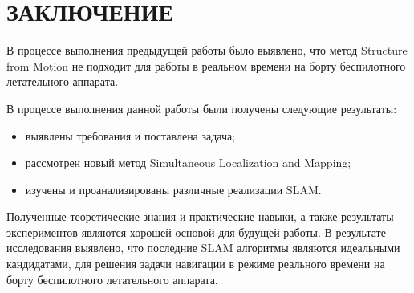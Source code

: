 \chapter*{ЗАКЛЮЧЕНИЕ}

В процессе выполнения предыдущей работы было выявлено, что метод Structure from Motion не подходит для работы в реальном времени на борту беспилотного летательного аппарата.

В процессе выполнения данной работы были получены следующие результаты:

\begin{itemize}
    \item выявлены требования и поставлена задача;
    \item рассмотрен новый метод Simultaneous Localization and Mapping;
    \item изучены и проанализированы различные реализации SLAM.
\end{itemize}

Полученные теоретические знания и практические навыки, а также результаты экспериментов являются хорошей основой для будущей работы. В результате исследования выявлено, что последние SLAM алгоритмы являются идеальными кандидатами, для решения задачи навигации в режиме реального времени на борту беспилотного летательного аппарата.
\newpage
